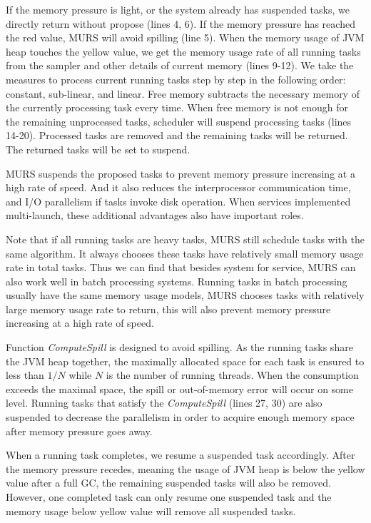 If the memory pressure is light, or the system already has suspended tasks, we directly return without propose (lines 4, 6). If the memory pressure has reached the red value, MURS will avoid spilling (line 5). When the memory usage of JVM heap touches the yellow value, we get the memory usage rate of all running tasks from the sampler and other details of current memory (lines 9-12). We take the measures to process current running tasks step by step in the following order: constant, sub-linear, and linear. Free memory subtracts the necessary memory of the currently processing task every time. When free memory is not enough for the remaining unprocessed tasks, scheduler will suspend processing tasks (lines 14-20). Processed tasks are removed and the remaining tasks will be returned. The returned tasks will be set to suspend.

MURS suspends the proposed tasks to prevent memory pressure increasing at a high rate of speed. And it also reduces the interprocessor communication time, and I/O parallelism if tasks invoke disk operation. When services implemented multi-launch, these additional advantages also have important roles.

Note that if all running tasks are heavy tasks, MURS still schedule tasks with the same algorithm. It always chooses these tasks have relatively small memory usage rate in total tasks. Thus we can find that besides system for service, MURS can also work well in batch processing systems. Running tasks in batch processing usually have the same memory usage models, MURS chooses tasks with relatively large memory usage rate to return, this will also prevent memory pressure increasing at a high rate of speed.

Function \textit{ComputeSpill} is designed to avoid spilling. As the running tasks share the JVM heap together, the maximally allocated space for each task is ensured to less than $1/N$ while $N$ is the number of running threads. When the consumption exceeds the maximal space, the spill or out-of-memory error will occur on some level. Running tasks that satisfy the \textit{ComputeSpill} (lines 27, 30) are also suspended to decrease the parallelism in order to acquire enough memory space after memory pressure goes away.   

When a running task completes, we resume a suspended task accordingly. After the memory pressure recedes, meaning the usage of JVM heap is below the yellow value after a full GC, the remaining suspended tasks will also be removed. However, one completed task can only resume one suspended task and the memory usage below yellow value will remove all suspended tasks.





